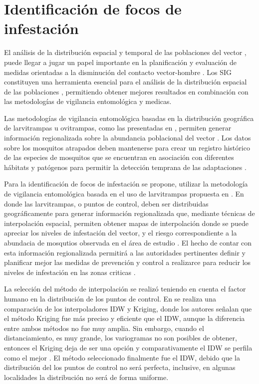 \section{Identificación de focos de infestación}
\label{sec:cap4-identificacion-focos}

El análisis de la distribución espacial y temporal de las poblaciones del vector
\cite{dengueUruguayCap1, cenaprece2013,nino2008uso}, puede llegar a jugar un papel importante en
la planificación y evaluación de medidas orientadas a la disminución del contacto vector-hombre
\cite{nino2008uso}. Los SIG constituyen una herramienta esencial para el análisis de la
distribución espacial de las poblaciones \cite{vgomesAegis2001,petric2012surveillance},
permitiendo obtener mejores resultados en combinación con las metodologías de vigilancia
entomológica y medicas\cite{petric2012surveillance}.

Las metodologías de vigilancia entomológica basadas en la distribución geográfica de larvitrampas
u ovitrampas, como las presentadas en
\cite{NINO2011,petric2012surveillance, journal.pone.0054167,nino2008uso}, permiten generar
información regionalizada sobre la abundancia poblacional del vector \cite{NINO2011}. Los datos
sobre los mosquitos atrapados deben mantenerse para crear un registro histórico de las especies de
mosquitos que se encuentran en asociación con diferentes hábitats y patógenos para permitir la
detección temprana de las adaptaciones \cite{petric2012surveillance}.

Para la identificación de focos de infestación se propone, utilizar la metodología de vigilancia
entomológica basada en el uso de larvitrampas propuesta en \cite{NINO2011}. En donde las
larvitrampas, o puntos de control, deben ser distribuidas geográficamente para generar información
regionalizada que, mediante técnicas de interpolación espacial, permiten obtener mapas de
interpolación donde se puede apreciar los niveles de infestación del vector, y el riesgo
correspondiente a la abundacia de mosqutios observada en el área de estudio \cite{NINO2011, nino2008uso, journal.pone.0054167, albierispatial}. El hecho de contar con esta información
regionalizada permitirá a las autoridades pertinentes definir y planificar mejor las medidas de
prevención y control a realizarce para reducir los niveles de infestación en las zonas criticas
\cite{NINO2011, nino2008uso, petric2012surveillance}.

La selección del método de interpolación se realizó teniendo en cuenta el factor humano en la
distribución de los puntos de control. En \cite{villatoro2007comparacion} se realiza una
comparación de los interpoladores IDW y Kriging, donde los autores señalan que el método Kriging
fue más preciso y eficiente que el IDW, aunque la diferencia entre ambos métodos no fue muy amplia.
Sin embargo, cuando el distanciamiento, es muy grande, los variogramas no son posibles de obtener,
entonces el Kriging deja de ser una opción y comparativamente el IDW se perfila como el mejor
\cite{villatoro2007comparacion}. El método seleccionado finalmente fue el IDW, debido que la
distribución del los puntos de control no será perfecta, inclusive, en algunas localidades la
distribución no será de forma uniforme.


